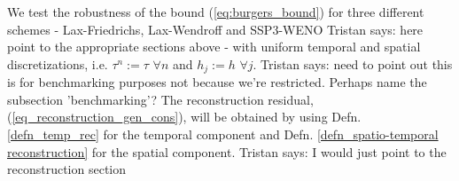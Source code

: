 \documentclass[final]{amsart}
\newcommand{\tristan}[1]{{\color{purple} Tristan says:  #1 }}
\numberwithin{equation}{section}
\begin{document}

We test the robustness of the bound (\ref{eq:burgers_bound}) for three
different schemes - Lax-Friedrichs, Lax-Wendroff and SSP3-WENO
\tristan{here point to the appropriate sections above} - with uniform
temporal and spatial discretizations, i.e. $\tau^n:=\tau $ $\forall n$
and $h_j:=h$ $\forall j$. \tristan{need to point out this is for
  benchmarking purposes not because we're restricted. Perhaps name the
  subsection 'benchmarking'?} The reconstruction residual,
(\ref{eq_reconstruction_gen_cons}), will be obtained by using
Defn. \ref{defn_temp_rec} for the temporal component and
Defn. \ref{defn_spatio-temporal reconstruction} for the spatial
component. \tristan{I would just point to the reconstruction section}
\end{document}
